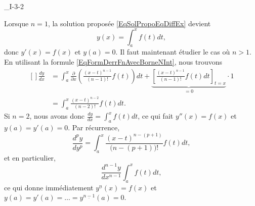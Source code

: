 

\begin{corrige}{_I-3-2}

Lorsque $n=1$, la solution proposée \eqref{EqSolPropoEqDiffEx} devient
\begin{equation}
	y(x)=\int_a^xf(t)dt,
\end{equation}
donc $y'(x)=f(x)$ et $y(a)=0$. Il faut maintenant étudier le cas où $n>1$. En utilisant la formule \eqref{EqFormDerrFnAvecBorneNInt}, nous trouvons
\begin{equation}
	\begin{aligned}[]
	\frac{ dy }{ dx }	&=	\int_a^x \frac{ \partial  }{ \partial x }\left( \frac{ (x-t)^{n-1} }{ (n-1)! }f(t)\right)dt+\underbrace{\left[   \frac{ (x-t)^{n-1} }{ (n-1)! }f(t)dt  \right]_{t=x}}_{=0}\cdot 1\\
				&=\int_a^x\frac{ (x-t)^{n-2} }{ (n-2)! }f(t)dt.
	\end{aligned}
\end{equation}
Si $n=2$, nous avons donc $\frac{ dy }{ dx }=\int_a^xf(t)dt$, ce qui fait $y''(x)=f(x)$ et $y(a)=y'(a)=0$. Par récurrence,
\begin{equation}
	\frac{ d^py }{ dy^p }=\int_a^x\frac{ (x-t)^{n-(p+1)} }{ \big( n-(p+1) \big)! }f(t)dt,
\end{equation}
et en particulier,
\begin{equation}
	\frac{ d^{n-1}y }{ dx^{n-1} }\int_a^xf(t)dt,
\end{equation}
ce qui donne immédiatement $y^{\underline{n}}(x)=f(x)$ et $y(a)=y'(a)=\ldots=y^{\underline{n-1}}(a)=0$.

\end{corrige}
